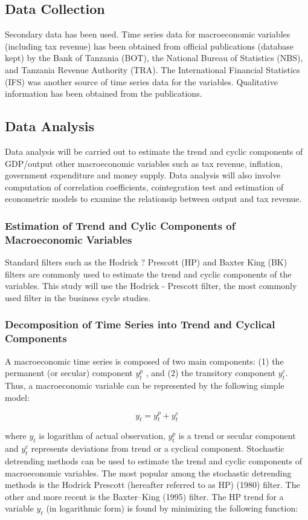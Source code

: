 \documentclass[12pt,a4paper,final]{article}
\begin{document}
\subsection{Data Collection}

Secondary data has been used. Time series data for macroeconomic variables (including tax revenue) has been obtained from official publications (database kept) by the Bank of Tanzania (BOT), the National Bureau of Statistics (NBS), and Tanzania Revenue Authority (TRA).  The International Financial Statistics (IFS) was another source of time series data for the variables.  Qualitative information has been obtained from the publications.

\subsection{Data Analysis}

Data analysis will be carried out to estimate the trend and cyclic components of GDP/output other macroeconomic variables such as tax revenue, inflation, government expenditure and money supply. Data analysis will also involve computation of correlation coefficients, cointegration test and estimation of econometric models to examine the relationsip between output and tax revenue.

\subsubsection{Estimation of Trend and Cylic Components of Macroeconomic Variables}

Standard filters such as the Hodrick ? Prescott (HP) and Baxter King (BK) filters are commonly used to estimate the trend and cyclic components of the variables.  This study will use the Hodrick - Prescott filter, the most commonly used filter in the business cycle studies.

\subsubsection*{Decomposition of Time Series into Trend and Cyclical Components}

A macroeconomic time series   is composed of two main components: (1) the permanent (or secular) component $y_t^p$ , and (2) the transitory component  $y_t^c$. Thus, a macroeconomic variable can be represented by the following simple model:

\[ y_t = y_t^p + y_t^c \]

where $y_t$  is logarithm of actual observation, $y_t^p$  is a trend or secular component and $y_t^c$  represents deviations from trend or a cyclical component.  Stochastic detrending methods can be used to estimate the trend and cyclic components of macroeconomic variables. The most popular among the stochastic detrending methods is the Hodrick Prescott  (hereafter referred to as HP) (1980) filter.  The other and more recent is the Baxter--King (1995) filter. The HP trend for a variable $y_t$ (in logarithmic form) is found by minimizing the following function:
\end{document}
